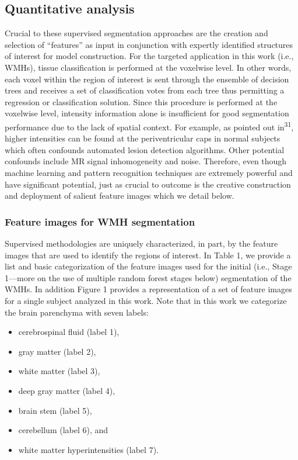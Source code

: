 \documentclass[11pt,]{article}
\providecommand{\tightlist}{%
  \setlength{\itemsep}{0pt}\setlength{\parskip}{0pt}}
\begin{document}
\subsection{Quantitative analysis}\label{quantitative-analysis}

Crucial to these supervised segmentation approaches are the creation and
selection of ``features'' as input in conjunction with expertly
identified structures of interest for model construction. For the
targeted application in this work (i.e., WMHs), tissue classification is
performed at the voxelwise level. In other words, each voxel within the
region of interest is sent through the ensemble of decision trees and
receives a set of classification votes from each tree thus permitting a
regression or classification solution. Since this procedure is performed
at the voxelwise level, intensity information alone is insufficient for
good segmentation performance due to the lack of spatial context. For
example, as pointed out in\textsuperscript{31}, higher intensities can
be found at the periventricular caps in normal subjects which often
confounds automated lesion detection algorithms. Other potential
confounds include MR signal inhomogeneity and noise. Therefore, even
though machine learning and pattern recognition techniques are extremely
powerful and have significant potential, just as crucial to outcome is
the creative construction and deployment of salient feature images which
we detail below.

\subsubsection{Feature images for WMH
segmentation}\label{feature-images-for-wmh-segmentation}

Supervised methodologies are uniquely characterized, in part, by the
feature images that are used to identify the regions of interest. In
Table 1, we provide a list and basic categorization of the feature
images used for the initial (i.e., Stage 1---more on the use of multiple
random forest stages below) segmentation of the WMHs. In addition Figure
1 provides a representation of a set of feature images for a single
subject analyzed in this work. Note that in this work we categorize the
brain parenchyma with seven labels:

\begin{itemize}
\tightlist
\item
  cerebrospinal fluid (label 1),
\item
  gray matter (label 2),
\item
  white matter (label 3),
\item
  deep gray matter (label 4),
\item
  brain stem (label 5),
\item
  cerebellum (label 6), and
\item
  white matter hyperintensities (label 7).
\end{itemize}
\end{document}
